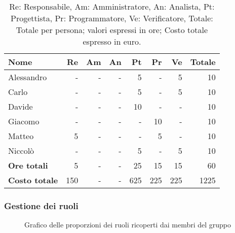 \begin{table}[H]
	\centering
	\begin{tabular}{l|r|r|r|r|r|r|r}
		\textbf{Nome}         & \textbf{Re} & \textbf{Am} & \textbf{An} & \textbf{Pt} & \textbf{Pr} & \textbf{Ve} & \textbf{Totale} \\
		\hline
		Alessandro            & -           & -           & -           & 5           & -           & 5           & 10              \\
		Carlo                 & -           & -           & -           & 5           & -           & 5           & 10              \\
		Davide                & -           & -           & -           & 10          & -           & -           & 10              \\
		Giacomo               & -           & -           & -           & -           & 10          & -           & 10              \\
		Matteo                & 5           & -           & -           & -           & 5           & -           & 10              \\
		Niccolò               & -           & -           & -           & 5           & -           & 5           & 10              \\
		\hline
		\textbf{Ore totali}   & 5           & -           & -           & 25          & 15          & 15          & 60              \\
		\textbf{Costo totale} & 150         & -           & -           & 625         & 225         & 225         & 1225
	\end{tabular}
	\caption{Re: Responsabile, Am: Amministratore, An: Analista, Pt: Progettista,
		Pr: Programmatore, Ve: Verificatore, Totale: Totale per persona; valori espressi in ore; Costo totale espresso in euro.}
\end{table}

\newpage
\subsubsection{Gestione dei ruoli}

\begin{figure}[h]
	\centering
	\caption{Grafico delle proporzioni dei ruoli ricoperti dai membri del gruppo}
\end{figure}

